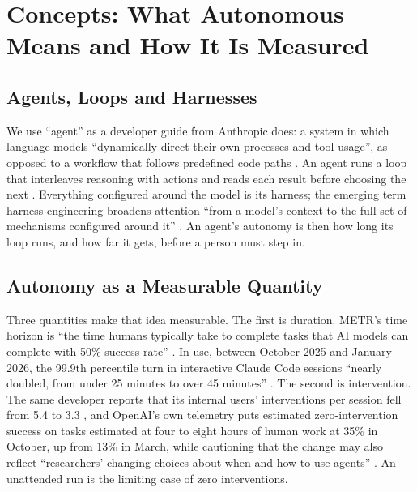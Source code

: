 \section{Concepts: What Autonomous Means and How It Is Measured}\label{sec:concepts}

\subsection{Agents, Loops and Harnesses}

We use ``agent'' as a developer guide from Anthropic does: a system in which language models ``dynamically direct their own processes and tool usage'', as opposed to a workflow that follows predefined code paths \citep{A15}. An agent runs a loop that interleaves reasoning with actions and reads each result before choosing the next \citep{A1}. Everything configured around the model is its harness; the emerging term harness engineering broadens attention ``from a model's context to the full set of mechanisms configured around it'' \citep[p.~1]{H2}. An agent's autonomy is then how long its loop runs, and how far it gets, before a person must step in.

\subsection{Autonomy as a Measurable Quantity}

Three quantities make that idea measurable. The first is duration. METR's time horizon is ``the time humans typically take to complete tasks that AI models can complete with 50\% success rate'' \citep[p.~1]{F1}. In use, between October 2025 and January 2026, the 99.9th percentile turn in interactive Claude Code sessions ``nearly doubled, from under 25 minutes to over 45 minutes'' \citep{F14}. The second is intervention. The same developer reports that its internal users' interventions per session fell from 5.4 to 3.3 \citep{F14}, and OpenAI's own telemetry puts estimated zero-intervention success on tasks estimated at four to eight hours of human work at 35\% in October, up from 13\% in March, while cautioning that the change may also reflect ``researchers' changing choices about when and how to use agents'' \citep{F32}. An unattended run is the limiting case of zero interventions.


